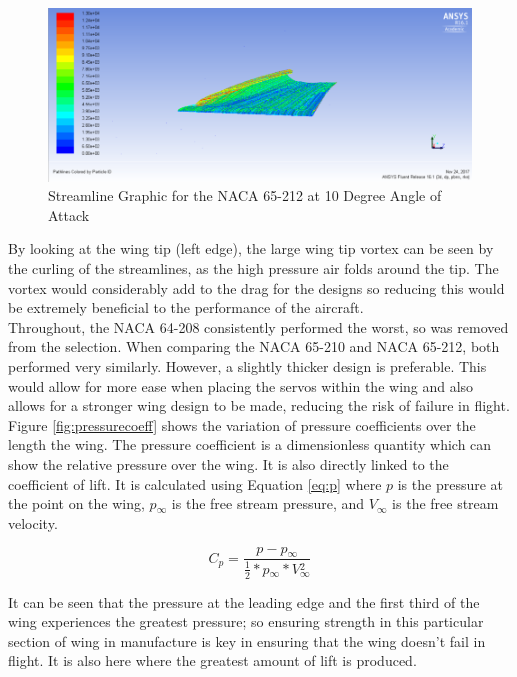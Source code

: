 \documentclass[12pt]{article}
\begin{document}
\begin{figure}[H]
\includegraphics[width=18cm, scale=1]{naca65212streamline.png}
\centering
\caption{Streamline Graphic for the NACA 65-212 at 10 Degree Angle of Attack}
\label{fig:nac65212}
\end{figure}

\noindent By looking at the wing tip (left edge), the large wing tip vortex can be seen by the curling of the streamlines, as the high pressure air folds around the tip. The vortex would considerably add to the drag for the designs so reducing this would be extremely beneficial to the performance of the aircraft. \\

\noindent Throughout, the NACA 64-208 consistently performed the worst, so was removed from the selection. When comparing the NACA 65-210 and NACA 65-212, both performed very similarly. However, a slightly thicker design is preferable. This would allow for more ease when placing the servos within the wing and also allows for a stronger wing design to be made, reducing the risk of failure in flight. \\

\noindent Figure \ref{fig:pressurecoeff} shows the variation of pressure coefficients over the length the wing. The pressure coefficient is a dimensionless quantity which can show the relative pressure over the wing. It is also directly linked to the coefficient of lift. It is calculated using Equation \ref{eq:p} where $p$ is the pressure at the point on the wing, $p{_\infty}$ is the free stream pressure, and $V{_\infty}$ is the free stream velocity.

\begin{equation} \label{eq:p}
C{_p} = \frac{p-p{_\infty}}{\frac{1}{2}*p{_\infty}*V{^2_\infty}}
\end{equation}

\noindent It can be seen that the pressure at the leading edge and the first third of the wing experiences the greatest pressure; so ensuring strength in this particular section of wing in manufacture is key in ensuring that the wing doesn’t fail in flight. It is also here where the greatest amount of lift is produced. \\
\end{document}

